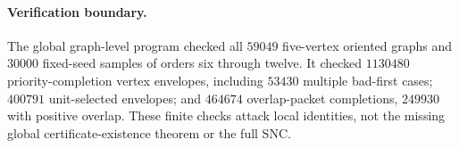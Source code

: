 \paragraph{Verification boundary.}
The global graph-level program checked all $59049$ five-vertex oriented
graphs and $30000$ fixed-seed samples of orders six through twelve.
It checked $1130480$ priority-completion vertex envelopes, including
$53430$ multiple bad-first cases; $400791$ unit-selected envelopes;
and $464674$ overlap-packet completions, $249930$ with positive overlap.
These finite checks attack local identities, not the missing global
certificate-existence theorem or the full SNC.
